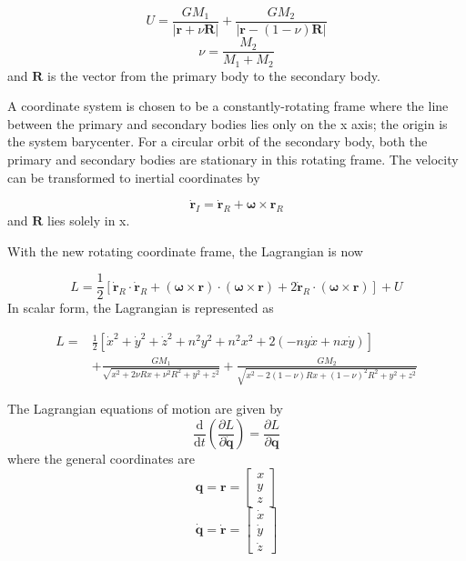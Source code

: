 \documentclass[]{aiaa-tc}%
\begin{document}
\begin{equation}
U=\frac{GM_1}{\left | \mathbf{r}+\nu \boldsymbol{\mathbf{R}} \right |} + \frac{GM_2}{\left | \mathbf{r}-\left (1-\nu  \right ) \boldsymbol{\mathbf{R}} \right |}
\end{equation}
\begin{equation}
\nu=\frac{M_2}{M_1+M_2}
\end{equation}
and $\mathbf{R}$ is the vector from the primary body to the secondary body. 

A coordinate system is chosen to be a constantly-rotating frame where the line between the primary and secondary bodies lies only on the x axis; the origin is the system barycenter. For a circular orbit of the secondary body, both the primary and secondary bodies are stationary in this rotating frame. The velocity can be transformed to inertial coordinates by

\begin{equation}
\mathbf{\dot{r}}_{I}=\mathbf{\dot{r}}_{R}+\boldsymbol{\omega}\times \mathbf{r}_{R} 
\end{equation}
and $\mathbf{R}$ lies solely in x.

With the new rotating coordinate frame, the Lagrangian is now

\begin{equation}
L=\frac{1}{2}\left [ \mathbf{\dot{r}}_R\cdot \mathbf{\dot{r}}_R + \left ( \boldsymbol{\omega} \times \mathbf{r} \right ) \cdot \left ( \boldsymbol{\omega} \times \mathbf{r} \right ) +2\mathbf{\dot{r}}_R \cdot \left (  \boldsymbol{\omega} \times \mathbf{r} \right )\right ] +U
\end{equation}
In scalar form, the Lagrangian is represented as

\begin{equation}
\begin{aligned} 
L=&\frac{1}{2}\left [ \dot{x}^2+\dot{y}^2+\dot{z}^2+ n^2y^2+n^2x^2 +2(-ny\dot{x}+nx\dot{y})\right ]\\&+\frac{GM_1}{\sqrt{x^2+2\nu Rx+\nu^2R^2+y^2+z^2}} + \frac{GM_2}{\sqrt{x^2-2(1-\nu) Rx+(1-\nu)^2R^2+y^2+z^2}}
\end{aligned}
\end{equation}


The Lagrangian equations of motion are given by 
\begin{equation}
\frac{\mathrm{d} }{\mathrm{d} t}\left ( \frac{\partial L}{\partial \mathbf{\dot{q}}} \right ) = \frac{\partial L}{\partial \mathbf{q}}
\end{equation}
where the general coordinates are
\begin{equation}
\mathbf{q}=\mathbf{r}=
\begin{bmatrix}
x\\y\\z
\end{bmatrix}
\end{equation}
\begin{equation}
\mathbf{\dot{q}}=\mathbf{\dot{r}}=
\begin{bmatrix}
\dot{x}\\
\dot{y}\\
\dot{z}
\end{bmatrix}
\end{equation}
\end{document}
